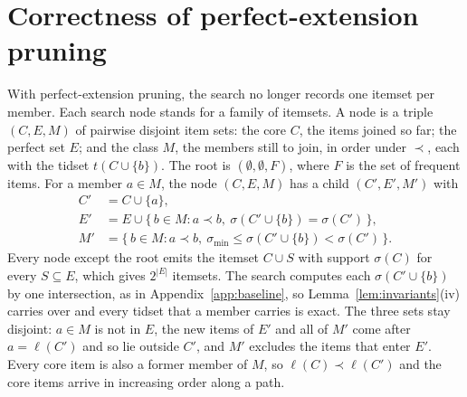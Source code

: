 \section{Correctness of perfect-extension pruning}
\label{app:perfect}
With perfect-extension pruning, the search no longer records one itemset per member.
Each search node stands for a family of itemsets. A node is a triple $(C, E, M)$ of
pairwise disjoint item sets: the core $C$, the items joined so far; the perfect set $E$;
and the class $M$, the members still to join, in order under $\prec$, each with the
tidset $t(C \cup \{b\})$. The root is $(\emptyset, \emptyset, F)$, where $F$ is the set of
frequent items. For a member $a \in M$, the node $(C, E, M)$ has a child $(C', E', M')$
with
\begin{align}
  C' &= C \cup \{a\}, \nonumber\\
  E' &= E \cup \{\, b \in M : a \prec b,\ \sigma(C' \cup \{b\}) = \sigma(C') \,\},
    \label{eq:perfect-set}\\
  M' &= \{\, b \in M : a \prec b,\ \sigma_{\min} \le \sigma(C' \cup \{b\}) < \sigma(C') \,\}.
    \nonumber
\end{align}
Every node except the root emits the itemset $C \cup S$ with support $\sigma(C)$ for
every $S \subseteq E$, which gives $2^{|E|}$ itemsets. The search computes each
$\sigma(C' \cup \{b\})$ by one intersection, as in Appendix~\ref{app:baseline}, so
Lemma~\ref{lem:invariants}(iv) carries over and every tidset that a member carries is
exact. The three sets stay disjoint: $a \in M$ is not in $E$, the new items of $E'$ and
all of $M'$ come after $a = \ell(C')$ and so lie outside $C'$, and $M'$ excludes the
items that enter $E'$. Every core item is also a former member of $M$, so
$\ell(C) \prec \ell(C')$ and the core items arrive in increasing order along a path.

